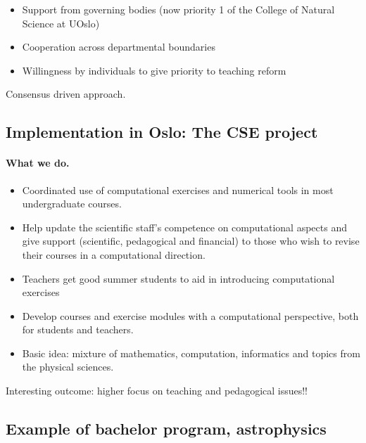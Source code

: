 \documentclass[%
twoside,                 %
final,                   %
10pt]{article}
\begin{document}
\begin{itemize}
\item Support from governing bodies (now priority 1 of the College of Natural Science at UOslo)

\item Cooperation across departmental boundaries

\item Willingness by individuals to give priority to teaching reform
\end{itemize}

\noindent
Consensus driven approach.





\subsection*{Implementation in Oslo: The CSE  project}

\paragraph{What we do.}
\begin{itemize}
\item Coordinated use of computational exercises and numerical tools in most undergraduate courses.

\item Help update the scientific staff's competence on computational aspects and give support (scientific, pedagogical and financial)  to those who wish to revise  their courses in a computational direction.

\item Teachers get good summer students to aid in introducing computational exercises

\item Develop courses and exercise modules with a computational perspective, both for students and teachers. 

\item Basic idea: mixture of mathematics, computation, informatics and topics from the physical sciences.
\end{itemize}

\noindent
Interesting outcome: higher focus on teaching and pedagogical issues!!




\subsection*{Example of bachelor program, astrophysics}
\end{document}
